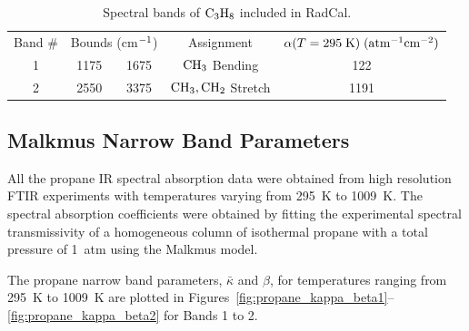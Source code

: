 \begin{table}[ht]
   \centering
   \caption{Spectral bands of $\rm C_3H_8$ included in RadCal.}
   \vspace{0.1in}
   \label{Table::C3H8}
   \begin{tabular}{|c|c|c|c|c|}
    \hline
    Band \# & \multicolumn{2}{|l|}{Bounds (cm$\rm ^{-1}$) } & Assignment & $\alpha(T=295 \; {\rm K}) \; (\rm {atm^{-1} cm^{-2}})$ \\
    \cline{1-5}
    1 & 1175 & 1675 &  $\rm CH_3$ Bending        & 122 \\
    2 & 2550 & 3375 &  $\rm CH_3, CH_2$ Stretch  & 1191 \\
    \hline
   \end{tabular}
\end{table}

\subsection{Malkmus Narrow Band Parameters}

All the propane IR spectral absorption data were obtained from high resolution FTIR experiments with temperatures varying from 295~K to 1009~K. The spectral absorption coefficients were obtained by fitting the experimental spectral transmissivity of a homogeneous column of isothermal propane with a total pressure of 1~atm using the Malkmus model.

The propane narrow band parameters, $\bar{\kappa}$ and $\beta$, for temperatures ranging from 295~K to 1009~K are plotted in Figures~\ref{fig:propane_kappa_beta1}--\ref{fig:propane_kappa_beta2} for Bands 1 to 2.

\newpage

